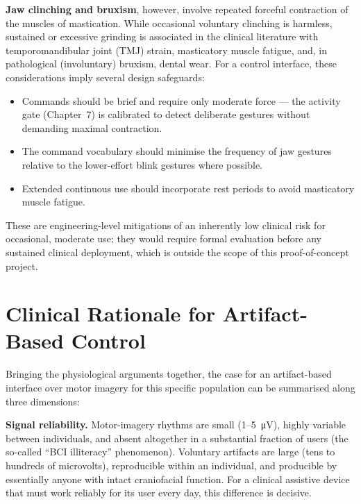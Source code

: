 \textbf{Jaw clinching and bruxism}, however, involve repeated forceful
contraction of the muscles of mastication. While occasional voluntary
clinching is harmless, sustained or excessive grinding is associated
in the clinical literature with temporomandibular joint (TMJ) strain,
masticatory muscle fatigue, and, in pathological (involuntary) bruxism,
dental wear. For a control interface, these considerations imply
several design safeguards:

\begin{itemize}[leftmargin=*]
    \item Commands should be brief and require only moderate force ---
    the activity gate (Chapter~7) is calibrated to detect deliberate
    gestures without demanding maximal contraction.
    \item The command vocabulary should minimise the frequency of
    jaw gestures relative to the lower-effort blink gestures where
    possible.
    \item Extended continuous use should incorporate rest periods to
    avoid masticatory muscle fatigue.
\end{itemize}

These are engineering-level mitigations of an inherently low clinical
risk for occasional, moderate use; they would require formal
evaluation before any sustained clinical deployment, which is outside
the scope of this proof-of-concept project.

\section{Clinical Rationale for Artifact-Based Control}
\label{sec:med_rationale}

Bringing the physiological arguments together, the case for an
artifact-based interface over motor imagery for this specific
population can be summarised along three dimensions:

\textbf{Signal reliability.} Motor-imagery rhythms are small
(1--\SI{5}{\micro\volt}), highly variable between individuals, and
absent altogether in a substantial fraction of users (the so-called
``BCI illiteracy'' phenomenon). Voluntary artifacts are large
(tens to hundreds of microvolts), reproducible within an individual,
and producible by essentially anyone with intact craniofacial
function. For a clinical assistive device that must work reliably for
its user every day, this difference is decisive.

